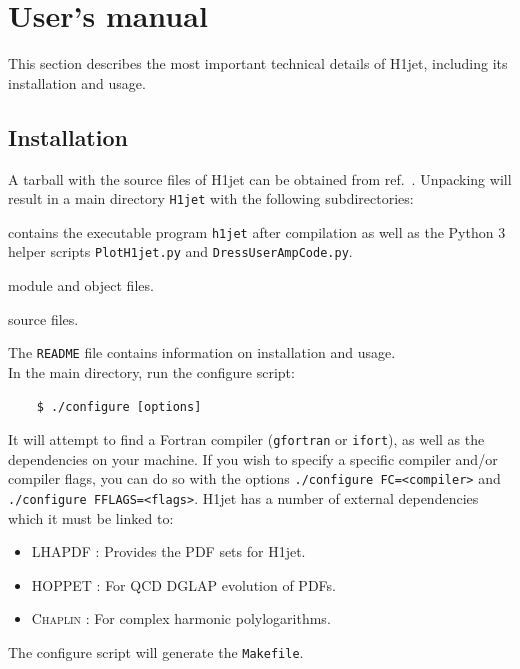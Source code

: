 \documentclass[12pt,a4wide]{article}
\begin{document}
\fi

\section{User's manual} \label{sec:manual} 

This section describes the most important technical details of H1jet, including its installation and usage. 

\subsection{Installation} 
A tarball with the source files of H1jet can be obtained from ref.\ \cite{bib:h1jet}. Unpacking will result in a main directory \texttt{H1jet} with the following subdirectories: 
\begin{description}[labelindent=\parindent, labelwidth =\widthof{\bfseries9999}, leftmargin = !]
	\item[\texttt{bin} :] contains the executable program \texttt{h1jet} after compilation as well as the Python 3 helper scripts \texttt{PlotH1jet.py} and \texttt{DressUserAmpCode.py}. 
	\item[\texttt{modules, obj} :] module and object files. 
	\item[\texttt{src} :] source files. 
\end{description}
The \texttt{README} file contains information on installation and usage. \\

In the main directory, run the configure script: 
\begin{lstlisting}
	$ ./configure [options] 
\end{lstlisting}
It will attempt to find a Fortran compiler (\texttt{gfortran} or \texttt{ifort}), as well as the dependencies on your machine. If you wish to specify a specific compiler and/or compiler flags, you can do so with the options \texttt{./configure FC=<compiler>} and \texttt{./configure FFLAGS=<flags>}. H1jet has a number of external dependencies which it must be linked to: 
\begin{itemize}
	\item LHAPDF \cite{bib:lhapdf}: Provides the PDF sets for H1jet. 
	\item \textsc{HOPPET} \cite{bib:hoppet}: For QCD DGLAP evolution of PDFs. 
	\item \textsc{Chaplin} \cite{bib:chaplin}: For complex harmonic polylogarithms. 
\end{itemize} 
The configure script will generate the \texttt{Makefile}. \\ 
\end{document}
